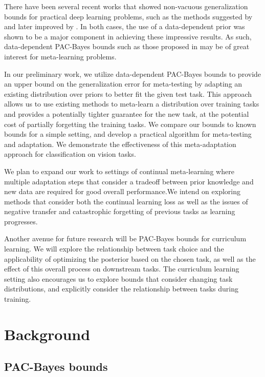 \documentclass{article}
\theoremstyle{definition}
\begin{document}
There have been several recent works that showed non-vacuous generalization bounds for practical deep learning problems, such as the methods suggested by \citet{Dziugaite2017} and later improved by \citet{Perez-Ortiz2021}. In both cases, the use of a data-dependent prior was shown to be a major component in achieving these impressive results. As such, data-dependent PAC-Bayes bounds such as those proposed in \citet{Rivasplata2020} may be of great interest for meta-learning problems.

In our preliminary work, we utilize data-dependent PAC-Bayes bounds to provide an upper bound on the generalization error for meta-testing by adapting an existing distribution over priors to better fit the given test task. This approach allows us to use existing methods to meta-learn a distribution over training tasks and provides a potentially tighter guarantee for the new task, at the potential cost of partially forgetting the training tasks. 
We compare our bounds to known bounds for a simple setting, and develop a practical algorithm for meta-testing and adaptation. We demonstrate the effectiveness of this meta-adaptation approach for classification on vision tasks.

We plan to expand our work to settings of continual meta-learning where multiple adaptation steps that consider a tradeoff between prior knowledge and new data are required for good overall performance.We intend on exploring methods that consider both the continual learning loss as well as the issues of negative transfer and catastrophic forgetting of previous tasks as learning progresses.

Another avenue for future research will be PAC-Bayes bounds for curriculum learning. We will explore the relationship between task choice and the applicability of optimizing the posterior based on the chosen task, as well as the effect of this overall process on downstream tasks.
The curriculum learning setting also encourages us to explore bounds that consider changing task distributions, and explicitly consider the relationship between tasks during training.

\section{Background} %

\subsection{PAC-Bayes bounds}
\end{document}

